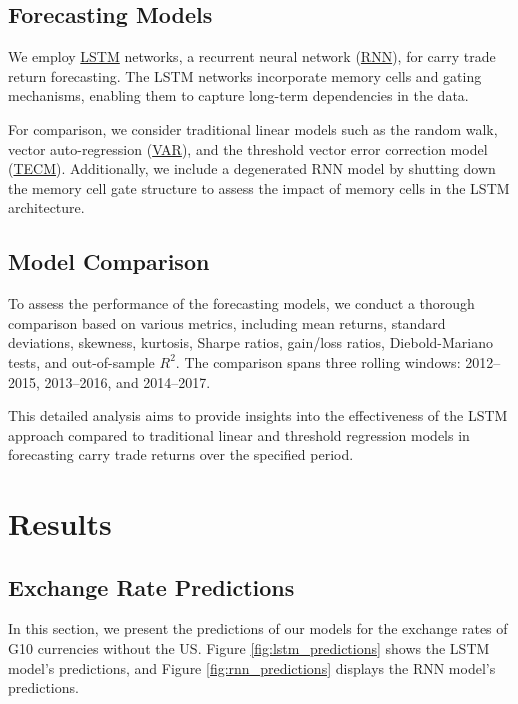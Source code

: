 \documentclass[a4paper,10pt]{article}
\begin{document}
\subsection{Forecasting Models}

We employ \hyperref[appx:lstm]{LSTM} networks, a recurrent neural network (\hyperref[appx:rnn]{RNN}), for carry trade return forecasting. The LSTM networks incorporate memory cells and gating mechanisms, enabling them to capture long-term dependencies in the data.

For comparison, we consider traditional linear models such as the random walk, vector auto-regression (\hyperref[appx:var]{VAR}), and the threshold vector error correction model (\hyperref[appx:tecm]{TECM}). Additionally, we include a degenerated RNN model by shutting down the memory cell gate structure to assess the impact of memory cells in the LSTM architecture.

\subsection{Model Comparison}

To assess the performance of the forecasting models, we conduct a thorough comparison based on various metrics, including mean returns, standard deviations, skewness, kurtosis, Sharpe ratios, gain/loss ratios, Diebold-Mariano tests, and out-of-sample \(R^2\). The comparison spans three rolling windows: 2012–2015, 2013–2016, and 2014–2017.

This detailed analysis aims to provide insights into the effectiveness of the LSTM approach compared to traditional linear and threshold regression models in forecasting carry trade returns over the specified period.


\section{Results}

\subsection{Exchange Rate Predictions}

In this section, we present the predictions of our models for the exchange rates of G10 currencies without the US. Figure \ref{fig:lstm_predictions} shows the LSTM model's predictions, and Figure \ref{fig:rnn_predictions} displays the RNN model's predictions.
\end{document}
